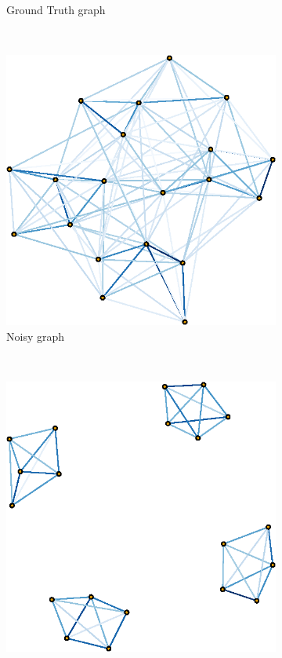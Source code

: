 \begin{figure}[!htb]
\begin{subfigure}[b]{0.3\textwidth}
        \caption{Ground Truth graph}
    \end{subfigure}
    ~ %
    \begin{subfigure}[b]{0.3\textwidth}
        \includegraphics[width=\textwidth]{block-diagonal/latex/figures/noisy_graph.eps}
        \caption{Noisy graph}
    \end{subfigure}
    ~ %
    \begin{subfigure}[b]{0.3\textwidth}
        \includegraphics[width=\textwidth]{block-diagonal/latex/figures/est_graph.eps}

\end{subfigure}
\end{figure}
